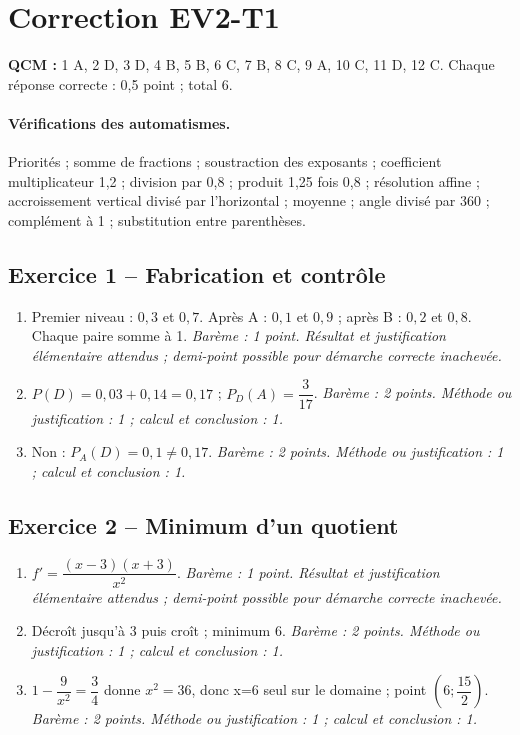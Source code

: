 \mxnewpage\section*{Correction EV2-T1}\label{EV2-T1-CORR}
\textbf{QCM :} 1 A, 2 D, 3 D, 4 B, 5 B, 6 C, 7 B, 8 C, 9 A, 10 C, 11 D, 12 C. Chaque réponse correcte : 0{,}5 point ; total 6.
\paragraph{Vérifications des automatismes.} Priorités ; somme de fractions ; soustraction des exposants ; coefficient multiplicateur 1{,}2 ; division par 0{,}8 ; produit 1{,}25 fois 0{,}8 ; résolution affine ; accroissement vertical divisé par l’horizontal ; moyenne ; angle divisé par 360 ; complément à 1 ; substitution entre parenthèses.
\subsection*{Exercice 1 -- Fabrication et contrôle}
\begin{enumerate}
\item Premier niveau : $0{,}3$ et $0{,}7$. Après A : $0{,}1$ et $0{,}9$ ; après B : $0{,}2$ et $0{,}8$. Chaque paire somme à 1. \textit{Barème : 1 point. Résultat et justification élémentaire attendus ; demi-point possible pour démarche correcte inachevée.}
\item $P(D)=0{,}03+0{,}14=0{,}17$ ; $P_D(A)=\dfrac{3}{17}$. \textit{Barème : 2 points. Méthode ou justification : 1 ; calcul et conclusion : 1.}
\item Non : $P_A(D)=0{,}1\ne0{,}17$. \textit{Barème : 2 points. Méthode ou justification : 1 ; calcul et conclusion : 1.}
\end{enumerate}
\subsection*{Exercice 2 -- Minimum d’un quotient}
\begin{enumerate}
\item $f\prime =\dfrac{(x-3)(x+3)}{x^2}$. \textit{Barème : 1 point. Résultat et justification élémentaire attendus ; demi-point possible pour démarche correcte inachevée.}
\item Décroît jusqu’à 3 puis croît ; minimum 6. \textit{Barème : 2 points. Méthode ou justification : 1 ; calcul et conclusion : 1.}
\item $1-\dfrac{9}{x^2}=\dfrac{3}{4}$ donne $x^2=36$, donc x=6 seul sur le domaine ; point $(6;\dfrac{15}{2})$. \textit{Barème : 2 points. Méthode ou justification : 1 ; calcul et conclusion : 1.}
\end{enumerate}
